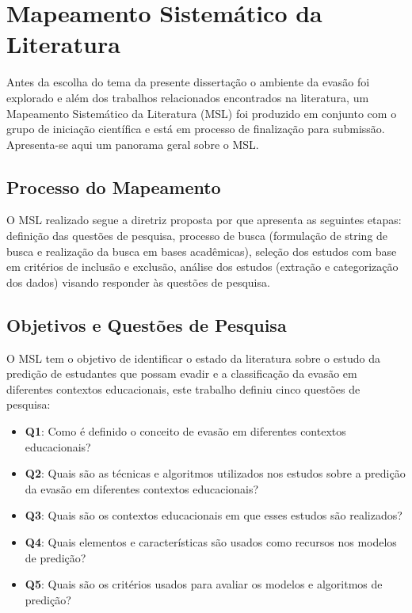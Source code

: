 \section{Mapeamento Sistemático da Literatura}\label{sec:Mapeamento}


Antes da escolha do tema da presente dissertação o ambiente da evasão foi explorado e além dos trabalhos relacionados encontrados na literatura, um Mapeamento Sistemático da Literatura (MSL) foi produzido em conjunto com o grupo de iniciação científica e está em processo de finalização para submissão. Apresenta-se aqui um panorama geral sobre o MSL.

\subsection{Processo do Mapeamento}\label{sec:procMapeamento}
O MSL realizado segue a diretriz proposta por  que apresenta as seguintes etapas: definição das questões de pesquisa, processo de busca (formulação de string de busca e realização da busca em bases acadêmicas), seleção dos estudos com base em critérios de inclusão e exclusão, análise dos estudos (extração e categorização dos dados) visando responder às questões de pesquisa.

\subsection{Objetivos e Questões de Pesquisa}\label{sec:objQuestoes}
O MSL tem o objetivo de identificar o estado da literatura sobre o estudo da predição de estudantes que possam evadir e a classificação da evasão em diferentes contextos educacionais, este trabalho definiu cinco questões de pesquisa:

\begin{itemize}
\item \textbf{Q1}: Como é definido o conceito de evasão em diferentes contextos educacionais?
\item \textbf{Q2}: Quais são as técnicas e algoritmos utilizados nos estudos sobre a predição da evasão em diferentes contextos educacionais?
\item \textbf{Q3}: Quais são os contextos educacionais em que esses estudos são realizados?
\item \textbf{Q4}: Quais elementos e características são usados como recursos nos modelos de predição?
\item \textbf{Q5}: Quais são os critérios usados para avaliar os modelos e algoritmos de predição?
\end{itemize}

